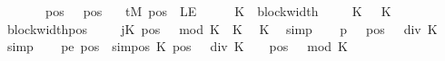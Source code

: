 \begin{isabellebody}
\ \ \ \ \ \ \ pos{}{\isacharcolon}{\kern0pt}\ {\isachardoublequoteopen}{}\ {\isasymle}\ pos{\isachardoublequoteclose}\isanewline
\ \ \ {\isachardoublequoteopen}tM{\isacharprime}{\kern0pt}\ pos\ {\isasymnoteq}\ LE{}{\isachardoublequoteclose}\isanewline
%
\isadelimproof
%
\endisadelimproof
%
\isatagproof
{}\isamarkupfalse%
\ {\isacharminus}{\kern0pt}\isanewline
\ \ \isamarkupfalse%
\ {\isacharquery}{\kern0pt}K\ {\isacharequal}{\kern0pt}\ {\isachardoublequoteopen}block{\isacharunderscore}{\kern0pt}width\ {\isasymGamma}{\isachardoublequoteclose}\isanewline
\ \ \isamarkupfalse%
\ K{}{\isacharcolon}{\kern0pt}\ {\isachardoublequoteopen}{}\ {\isasymle}\ {\isacharquery}{\kern0pt}K{\isachardoublequoteclose}\ \isamarkupfalse%
\ block{\isacharunderscore}{\kern0pt}width{\isacharunderscore}{\kern0pt}pos\ \isakeywordONE{{\isachardot}{\kern0pt}}\isamarkupfalse%
\isanewline
\ \ \isamarkupfalse%
\ jK{\isacharcolon}{\kern0pt}\ {\isachardoublequoteopen}{\isacharparenleft}{\kern0pt}pos\ {\isacharminus}{\kern0pt}\ {}{\isacharparenright}{\kern0pt}\ mod\ {\isacharquery}{\kern0pt}K\ {\isacharless}{\kern0pt}\ {\isacharquery}{\kern0pt}K{\isachardoublequoteclose}\ \isamarkupfalse%
\ K{}\ \isamarkupfalse%
\ simp\isanewline
\ \ \isamarkupfalse%
\ p{}{\isacharcolon}{\kern0pt}\ {\isachardoublequoteopen}{}\ {\isasymle}\ {\isacharparenleft}{\kern0pt}pos\ {\isacharminus}{\kern0pt}\ {}{\isacharparenright}{\kern0pt}\ div\ {\isacharquery}{\kern0pt}K\ {\isacharplus}{\kern0pt}\ {}{\isachardoublequoteclose}\ \isamarkupfalse%
\ simp\isanewline
\ \ \isamarkupfalse%
\ pe{\isacharcolon}{\kern0pt}\ {\isachardoublequoteopen}pos\ {\isacharequal}{\kern0pt}\ sim{\isacharunderscore}{\kern0pt}pos\ {\isacharquery}{\kern0pt}K\ {\isacharparenleft}{\kern0pt}{\isacharparenleft}{\kern0pt}pos\ {\isacharminus}{\kern0pt}\ {}{\isacharparenright}{\kern0pt}\ div\ {\isacharquery}{\kern0pt}K\ {\isacharplus}{\kern0pt}\ {}{\isacharparenright}{\kern0pt}\ {\isacharplus}{\kern0pt}\ {\isacharparenleft}{\kern0pt}pos\ {\isacharminus}{\kern0pt}\ {}{\isacharparenright}{\kern0pt}\ mod\ {\isacharquery}{\kern0pt}K{\isachardoublequoteclose}\isanewline
\ \ \isamarkupfalse%
\ {\isacharminus}{\kern0pt}\isanewline
\ \ \ \ \isamarkupfalse%

\end{isabellebody}
